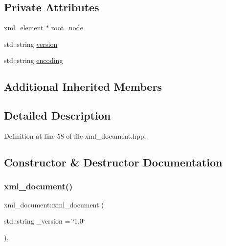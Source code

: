 \subsection*{Private Attributes}
\begin{DoxyCompactItemize}
\item 
\hyperlink{classxml__element}{xml\+\_\+element} $\ast$ \hyperlink{classxml__document_aeba8f7a07df1ca70afc36515de1bfd03}{root\+\_\+node}
\item 
std\+::string \hyperlink{classxml__document_a8ce53fb709ec7ba0697df31d1147c864}{version}
\item 
std\+::string \hyperlink{classxml__document_a2c30e0168483da7251ded20751cfe421}{encoding}
\end{DoxyCompactItemize}
\subsection*{Additional Inherited Members}


\subsection{Detailed Description}


Definition at line 58 of file xml\+\_\+document.\+hpp.



\subsection{Constructor \& Destructor Documentation}
\mbox{\label{classxml__document_a03cf3e32f87176a60732913df5bd5c96}} 
\subsubsection{\texorpdfstring{xml\+\_\+document()}{xml\_document()}}
{\footnotesize\ttfamily xml\+\_\+document\+::xml\+\_\+document (\begin{DoxyParamCaption}\item[{std\+::string}]{\+\_\+version = {\ttfamily \char`\"{}1.0\char`\"{}} }\end{DoxyParamCaption})\hspace{0.3cm}{\ttfamily [inline]}, {\ttfamily [explicit]}}



